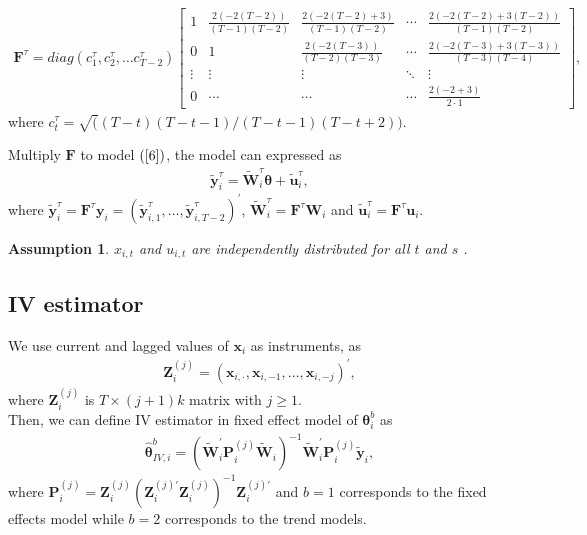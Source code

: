 \documentclass[12pt,a4paper,hyperref]{article}
\newtheorem{myAssu}{Assumption}
\begin{document}
\begin{align}
\boldsymbol{F}^{\tau}=diag(c^{\tau}_{1}, c^{\tau}_{2}, \ldots c^{\tau}_{T-2})
\begin{bmatrix}
1 & \frac{2(-2(T-2))}{(T-1)(T-2)} & \frac{2(-2(T-2)+3)}{(T-1)(T-2)} & \cdots & \frac{2(-2(T-2)+3(T-2))}{(T-1)(T-2)} \\
0 & 1 & \frac{2(-2(T-3))}{(T-2)(T-3)} & \cdots & \frac{2(-2(T-3)+3(T-3))}{(T-3)(T-4)} \\
\vdots &\vdots & \vdots & \ddots  &\vdots \\
0 & \cdots & \cdots & \cdots & \frac{2(-2+3)}{2 \cdot 1}
\end{bmatrix}, \label {7}
\end{align}   
where $c^{\tau}_{t}=\sqrt((T-t)(T-t-1)/(T-t-1)(T-t+2)).$

Multiply $\boldsymbol{F}$ to model $(\ref{6})$, the model can expressed as  
\begin{align}
\tilde{\boldsymbol{y}}^{\tau}_{i}= \tilde{\boldsymbol{W}}^{\tau}_{i}\boldsymbol{\theta}+\tilde{\boldsymbol{u}}^{\tau}_{i},
\end{align}
where $\tilde{\boldsymbol{y}}^{\tau}_{i}=\boldsymbol{F}^{\tau}\boldsymbol{y}_{i}= \left(\tilde{\boldsymbol{y}}^{\tau}_{i,1}, \ldots, \tilde{\boldsymbol{y}}^{\tau}_{i,T-2} \right)^{'}$,  $\tilde{\boldsymbol{W}}^{\tau}_{i}=\boldsymbol{F}^{\tau}\boldsymbol{W}_{i}$ and $\tilde{\boldsymbol{u}}^{\tau}_{i}=\boldsymbol{F}^{\tau}\boldsymbol{u}_{i}.$







\begin{myAssu}
$x_{i,t}$ and $u_{i,t}$ are independently distributed for all $t$ and $s$ .
\end{myAssu}


\subsection{IV estimator}
We use current and lagged values of $\boldsymbol{x}_{i}$ as instruments, as
\begin{align}
\boldsymbol{Z}^{(j)}_{i}=\left( \boldsymbol{x}_{i,\cdot}, \boldsymbol{x}_{i,-1},\ldots, \boldsymbol{x}_{i,-j} \right)^{'},
\end{align}
where $\boldsymbol{Z}^{(j)}_{i}$ is $T \times  (j+1)k$ matrix with $j \geq 1$. \\

Then, we can define IV estimator in fixed effect model of $\boldsymbol{\theta}^{b}_{i}$ as
\begin{align}
\hat{\boldsymbol{\theta}}^{b}_{IV,i}= \left( \tilde{\boldsymbol{W}}^{'}_{i}\boldsymbol{P}^{(j)}_{i} \tilde{\boldsymbol{W}}_{i} \right)^{-1} \tilde{\boldsymbol{W}}^{'}_{i}\boldsymbol{P}^{(j)}_{i} \tilde{\boldsymbol{y}}_{i},
\end{align}
where $\boldsymbol{P}^{(j)}_{i}=\boldsymbol{Z}^{(j)}_{i} \left(\boldsymbol{Z}^{(j)'}_{i}\boldsymbol{Z}^{(j)}_{i} \right)^{-1}\boldsymbol{Z}^{(j)'}_{i}$ and $b=1$ corresponds to the fixed effects model while $b=2$ corresponds to the trend models. 
\end{document}
